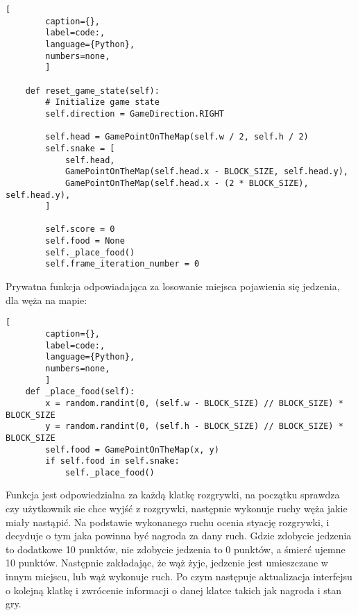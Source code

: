 \begin{onepage}
    \begin{lstlisting}[
        caption={},
        label=code:,
        language={Python},
        numbers=none,
        ]

    def reset_game_state(self):
        # Initialize game state
        self.direction = GameDirection.RIGHT

        self.head = GamePointOnTheMap(self.w / 2, self.h / 2)
        self.snake = [
            self.head,
            GamePointOnTheMap(self.head.x - BLOCK_SIZE, self.head.y),
            GamePointOnTheMap(self.head.x - (2 * BLOCK_SIZE), self.head.y),
        ]

        self.score = 0
        self.food = None
        self._place_food()
        self.frame_iteration_number = 0

    \end{lstlisting}
\end{onepage}


Prywatna funkcja odpowiadająca za losowanie miejsca pojawienia się jedzenia, dla węża na mapie:

\begin{onepage}
    \begin{lstlisting}[
        caption={},
        label=code:,
        language={Python},
        numbers=none,
        ]
    def _place_food(self):
        x = random.randint(0, (self.w - BLOCK_SIZE) // BLOCK_SIZE) * BLOCK_SIZE
        y = random.randint(0, (self.h - BLOCK_SIZE) // BLOCK_SIZE) * BLOCK_SIZE
        self.food = GamePointOnTheMap(x, y)
        if self.food in self.snake:
            self._place_food()
    \end{lstlisting}
\end{onepage}

\clearpage

Funkcja  jest odpowiedzialna za każdą klatkę rozgrywki, na początku sprawdza czy użytkownik sie chce wyjść z rozgrywki, następnie wykonuje ruchy węża jakie miały nastąpić. Na podstawie wykonanego ruchu ocenia styację rozgrywki, i decyduje o tym jaka powinna być nagroda za dany ruch. Gdzie zdobycie jedzenia to dodatkowe 10 punktów, nie zdobycie jedzenia to 0 punktów, a śmierć ujemne 10 punktów. Następnie zakładając, że wąż żyje, jedzenie jest umieszczane w innym miejscu, lub wąż wykonuje ruch. Po czym następuje aktualizacja interfejsu o kolejną klatkę i zwrócenie informacji o danej klatce takich jak nagroda i stan gry.

